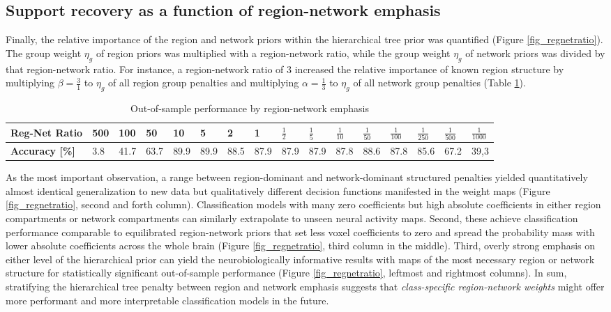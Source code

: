 \documentclass{article}
\begin{document}
\subsection{Support recovery as a function of region-network emphasis}
Finally, the relative importance of the
region and network priors within the hierarchical tree prior
was quantified (Figure \ref{fig_regnetratio}).
The group weight $\eta_g$ of region priors was multiplied with a
region-network ratio, while the
group weight $\eta_g$ of network priors was divided by that
region-network ratio. For instance, a region-network ratio of 3
increased the relative importance of known region structure
by multiplying $\beta = \frac{3}{1}$ to
$\eta_g$ of all region group penalties
and multiplying
$\alpha = \frac{1}{3}$ to $\eta_g$ of all network group penalties
(Table \ref{table_reg_net_ratio}).


\begin{table}[]
\centering
\caption{Out-of-sample performance by region-network emphasis}
\begin{tabular}{l|l|l|l|l|l|l|l|l|l|l|l|l|l|l|l}
\textbf{Reg-Net Ratio} & 500 & 100  & 50   & 10   & 5    & 2    & 1    & $\frac{1}{2}$  & $\frac{1}{5}$  & $\frac{1}{10}$ & $\frac{1}{50}$ & $\frac{1}{100}$ & $\frac{1}{250}$ & $\frac{1}{500}$ & $\frac{1}{1000}$ \\ \hline
\textbf{Accuracy {[}\%{]}}      & 3.8          & 41.7 & 63.7 & 89.9 & 89.9 & 88.5 & 87.9 & 87.9 & 87.9 & 87.8 & 88.6 & 87.8  & 85.6  & 67.2  & 39,3  
\end{tabular}
\label{table_reg_net_ratio}
\end{table}

As the most important observation,
a range between region-dominant and network-dominant structured penalties
yielded quantitatively almost identical generalization to new data
but qualitatively different decision functions manifested in the weight maps
(Figure \ref{fig_regnetratio}, second and forth column).
Classification models with many zero coefficients but high absolute
coefficients in either region compartments or network compartments
can similarly extrapolate to unseen neural activity maps.
Second,
these achieve classification performance
comparable to equilibrated region-network priors
that set less voxel coefficients to zero and spread the
probability mass with lower absolute coefficients across the whole brain
(Figure \ref{fig_regnetratio}, third column in the middle).
Third,
overly strong emphasis on either level of the hierarchical prior
can yield the neurobiologically informative results with maps
of the most necessary region or network structure for
statistically significant out-of-sample performance
(Figure \ref{fig_regnetratio}, leftmost and rightmost columns).
%
In sum,
stratifying the hierarchical tree penalty between region and network emphasis
suggests that \textit{class-specific region-network weights}
might offer more performant and more interpretable classification models
in the future.
\end{document}
